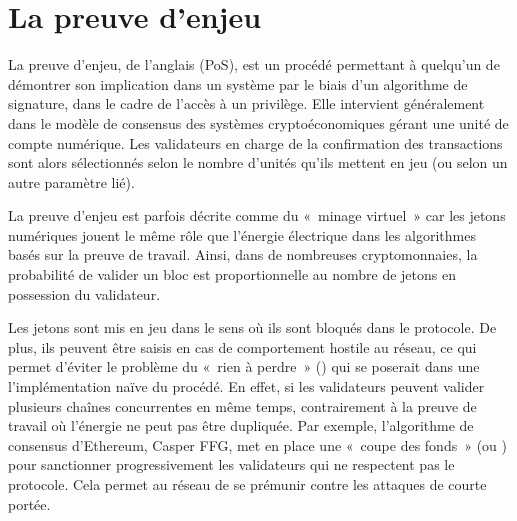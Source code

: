 %

\section*{La preuve d'enjeu}

La preuve d'enjeu, de l'anglais  (PoS), est un procédé permettant à quelqu'un de démontrer son implication dans un système par le biais d'un algorithme de signature, dans le cadre de l'accès à un privilège. Elle intervient généralement dans le modèle de consensus des systèmes cryptoéconomiques gérant une unité de compte numérique. Les validateurs en charge de la confirmation des transactions sont alors sélectionnés selon le nombre d'unités qu'ils mettent en jeu (ou selon un autre paramètre lié).

La preuve d'enjeu est parfois décrite comme du «~minage virtuel~» car les jetons numériques jouent le même rôle que l'énergie électrique dans les algorithmes basés sur la preuve de travail. Ainsi, dans de nombreuses cryptomonnaies, la probabilité de valider un bloc est proportionnelle au nombre de jetons en possession du validateur.

Les jetons sont mis en jeu dans le sens où ils sont bloqués dans le protocole. De plus, ils peuvent être saisis en cas de comportement hostile au réseau, ce qui permet d'éviter le problème du «~rien à perdre~» () qui se poserait dans une l'implémentation naïve du procédé. En effet, si les validateurs peuvent valider plusieurs chaînes concurrentes en même temps, contrairement à la preuve de travail où l'énergie ne peut pas être dupliquée. Par exemple, l'algorithme de consensus d'Ethereum, Casper FFG, met en place une «~coupe des fonds~» (ou ) pour sanctionner progressivement les validateurs qui ne respectent pas le protocole. Cela permet au réseau de se prémunir contre les attaques de courte portée.

